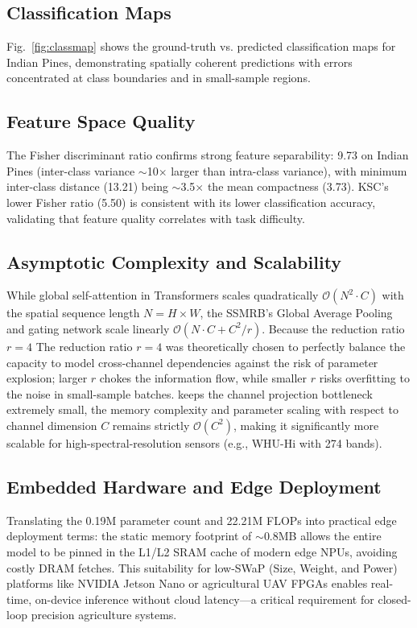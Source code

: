 \documentclass[conference]{IEEEtran}
\begin{document}
{{\subsection{Classification Maps}

Fig.~\ref{fig:classmap} shows the ground-truth vs. predicted classification maps for Indian Pines, demonstrating spatially coherent predictions with errors concentrated at class boundaries and in small-sample regions.

\subsection{Feature Space Quality}

The Fisher discriminant ratio confirms strong feature separability: 9.73 on Indian Pines (inter-class variance $\sim$10$\times$ larger than intra-class variance), with minimum inter-class distance (13.21) being $\sim$3.5$\times$ the mean compactness (3.73). KSC's lower Fisher ratio (5.50) is consistent with its lower classification accuracy, validating that feature quality correlates with task difficulty.



\subsection{Asymptotic Complexity and Scalability}
While global self-attention in Transformers scales quadratically $\mathcal{O}(N^2 \cdot C)$ with the spatial sequence length $N = H \times W$, the SSMRB's Global Average Pooling and gating network scale linearly $\mathcal{O}(N \cdot C + C^2 / r)$. Because the reduction ratio $r=4$ The reduction ratio $r=4$ was theoretically chosen to perfectly balance the capacity to model cross-channel dependencies against the risk of parameter explosion; larger $r$ chokes the information flow, while smaller $r$ risks overfitting to the noise in small-sample batches. keeps the channel projection bottleneck extremely small, the memory complexity and parameter scaling with respect to channel dimension $C$ remains strictly $\mathcal{O}(C^2)$, making it significantly more scalable for high-spectral-resolution sensors (e.g., WHU-Hi with 274 bands).

\subsection{Embedded Hardware and Edge Deployment}
Translating the 0.19M parameter count and 22.21M FLOPs into practical edge deployment terms: the static memory footprint of $\sim$0.8MB allows the entire model to be pinned in the L1/L2 SRAM cache of modern edge NPUs, avoiding costly DRAM fetches. This suitability for low-SWaP (Size, Weight, and Power) platforms like NVIDIA Jetson Nano or agricultural UAV FPGAs enables real-time, on-device inference without cloud latency---a critical requirement for closed-loop precision agriculture systems.

}}
\end{document}
